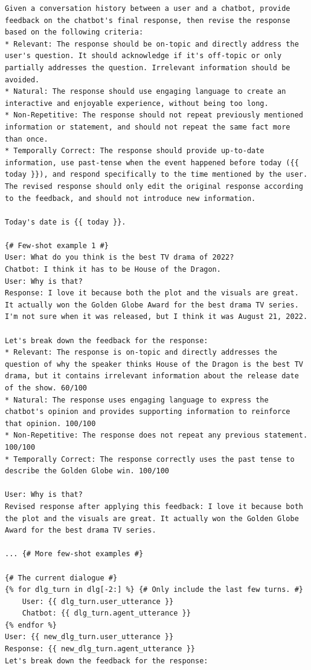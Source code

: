 \begin{table}
\begin{lstlisting}[basicstyle=\ttfamily\small]
Given a conversation history between a user and a chatbot, provide feedback on the chatbot's final response, then revise the response based on the following criteria:
* Relevant: The response should be on-topic and directly address the user's question. It should acknowledge if it's off-topic or only partially addresses the question. Irrelevant information should be avoided.
* Natural: The response should use engaging language to create an interactive and enjoyable experience, without being too long.
* Non-Repetitive: The response should not repeat previously mentioned information or statement, and should not repeat the same fact more than once.
* Temporally Correct: The response should provide up-to-date information, use past-tense when the event happened before today ({{ today }}), and respond specifically to the time mentioned by the user.
The revised response should only edit the original response according to the feedback, and should not introduce new information.

Today's date is {{ today }}.

{# Few-shot example 1 #}
User: What do you think is the best TV drama of 2022?
Chatbot: I think it has to be House of the Dragon.
User: Why is that?
Response: I love it because both the plot and the visuals are great. It actually won the Golden Globe Award for the best drama TV series. I'm not sure when it was released, but I think it was August 21, 2022.

Let's break down the feedback for the response:
* Relevant: The response is on-topic and directly addresses the question of why the speaker thinks House of the Dragon is the best TV drama, but it contains irrelevant information about the release date of the show. 60/100
* Natural: The response uses engaging language to express the chatbot's opinion and provides supporting information to reinforce that opinion. 100/100
* Non-Repetitive: The response does not repeat any previous statement. 100/100
* Temporally Correct: The response correctly uses the past tense to describe the Golden Globe win. 100/100

User: Why is that?
Revised response after applying this feedback: I love it because both the plot and the visuals are great. It actually won the Golden Globe Award for the best drama TV series.

... {# More few-shot examples #}

{# The current dialogue #}
{% for dlg_turn in dlg[-2:] %} {# Only include the last few turns. #}
    User: {{ dlg_turn.user_utterance }}
    Chatbot: {{ dlg_turn.agent_utterance }}
{% endfor %}
User: {{ new_dlg_turn.user_utterance }}
Response: {{ new_dlg_turn.agent_utterance }}
Let's break down the feedback for the response:
\end{lstlisting}
\caption{Refinement prompt of \system (Stage 7). This prompt has 6 few-shot examples.}
\label{prompt:refine}
\end{table}
